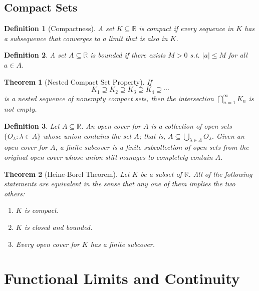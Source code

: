 \documentclass[10pt]{article}
\newtheorem{theorem}{Theorem}[section]
\newtheorem{definition}{Definition}[section]
\begin{document}
\subsection{Compact Sets}

\begin{definition}[Compactness]
    A set $K\subseteq\mathbb{R}$ is compact if every sequence in $K$ has a subsequence that converges to a limit that is also in $K$.
\end{definition}

\begin{definition}
    A set $A\subseteq\mathbb{R}$ is bounded if there exists $M>0$ s.t. $|a|\le M$ for all $a\in A$.
\end{definition}

\begin{theorem}[Nested Compact Set Property]
    If
    \[K_1\supseteq K_2\supseteq K_3\supseteq K_4\supseteq\cdots\]
    is a nested sequence of nonempty compact sets, then the intersection $\bigcap_{n=1}^\infty K_n$ is not empty.
\end{theorem}

\begin{definition}
    Let $A\subseteq\mathbb{R}$. An open cover for $A$ is a collection of open sets $\{O_\lambda:\lambda\in A\}$ whose union contains the set $A$; that is, $A\subseteq \bigcup_{\lambda\in\Lambda}O_\lambda.$ Given an open cover for $A$, a finite subcover is a finite subcollection of open sets from the original open cover whose union still manages to completely contain $A$.
\end{definition}


\begin{theorem}[Heine-Borel Theorem]
    Let $K$ be a subset of $\mathbb{R}.$ All of the following statements are equivalent in the sense that any one of them implies the two others:
    \begin{enumerate}
        \item $K$ is compact.
        \item $K$ is closed and bounded.
        \item Every open cover for $K$ has a finite subcover.
    \end{enumerate}
\end{theorem}

\section{Functional Limits and Continuity}
\end{document}
